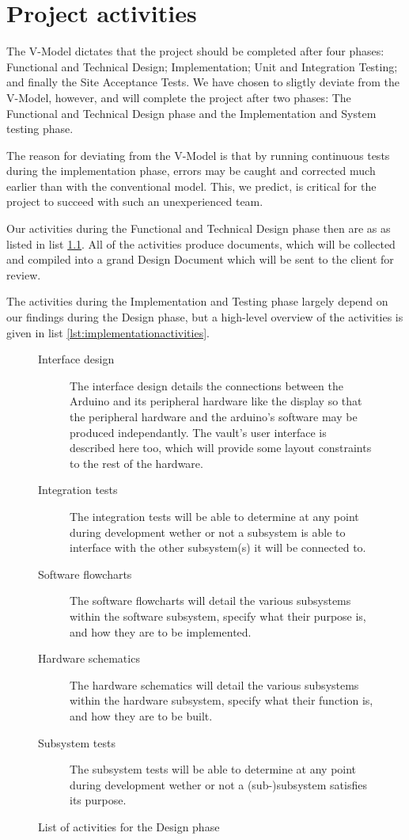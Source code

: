 \chapter{Project activities}
The V-Model dictates\cite{vmodel} that the project should be completed after four phases: Functional and Technical Design; Implementation; Unit and Integration Testing; and finally the Site Acceptance Tests. We have chosen to sligtly deviate from the V-Model, however, and will complete the project after two phases: The Functional and Technical Design phase and the Implementation and System testing phase.

The reason for deviating from the V-Model is that by running continuous tests during the implementation phase, errors may be caught and corrected much earlier than with the conventional model. This, we predict, is critical for the project to succeed with such an unexperienced team.

Our activities during the Functional and Technical Design phase then are as as listed in list \ref{lst:designactivities}. All of the activities produce documents, which will be collected and compiled into a grand Design Document which will be sent to the client for review.

The activities during the Implementation and Testing phase largely depend on our findings during the Design phase, but a high-level overview of the activities is given in list \ref{lst:implementationactivities}.

\begin{figure}
\caption{List of activities for the Design phase}
\begin{description}
\item[Interface design] The interface design details the connections between the Arduino and its peripheral hardware like the display so that the peripheral hardware and the arduino's software may be produced independantly. The vault's user interface is described here too, which will provide some layout constraints to the rest of the hardware.
\item[Integration tests] The integration tests will be able to determine at any point during development wether or not a subsystem is able to interface with the other subsystem(s) it will be connected to.
\item[Software flowcharts] The software flowcharts will detail the various subsystems within the software subsystem, specify what their purpose is, and how they are to be implemented.
\item[Hardware schematics] The hardware schematics will detail the various subsystems within the hardware subsystem, specify what their function is, and how they are to be built.
\item[Subsystem tests] The subsystem tests will be able to determine at any point during development wether or not a (sub-)subsystem satisfies its purpose.
\end{description}
\label{lst:designactivities}
\end{figure}

